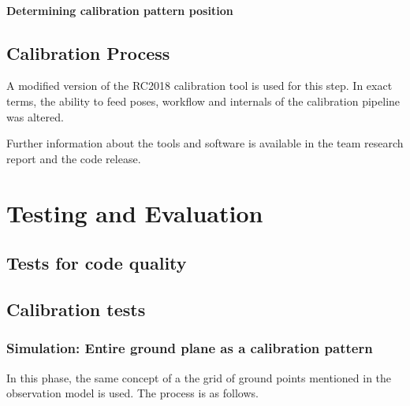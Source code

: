 \documentclass[english, printversion, nomenclature, notitle]{tuvisionthesis} %
\begin{document}

\subsubsection{Determining calibration pattern position}

\section{Calibration Process}
A modified version of the RC2018 calibration tool is used for this step. In exact terms, the ability to feed poses, workflow and internals of the calibration pipeline was altered.

Further information about the tools and software is available in the team research report and the code release. 


\chapter{Testing and Evaluation}
\section{Tests for code quality}
\section{Calibration tests}
\subsection{Simulation: Entire ground plane as a calibration pattern}

In this phase, the same concept of a the grid of ground points mentioned in the observation model is used. The process is as follows.
\end{document}
